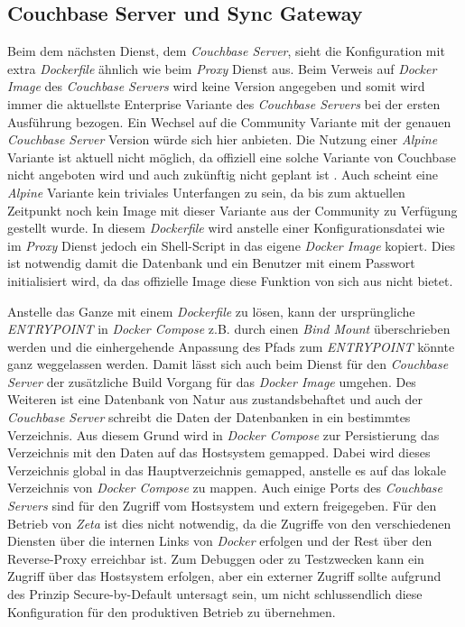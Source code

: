 \subsection{Couchbase Server und Sync Gateway}

Beim dem nächsten Dienst, dem \textit{Couchbase Server}, sieht die Konfiguration mit extra \textit{Dockerfile} ähnlich wie beim \textit{Proxy} Dienst aus. Beim Verweis auf \textit{Docker Image} des \textit{Couchbase Servers} wird keine Version angegeben und somit wird immer die aktuellste Enterprise Variante des \textit{Couchbase Servers} bei der ersten Ausführung bezogen. Ein Wechsel auf die Community Variante mit der genauen \textit{Couchbase Server} Version würde sich hier anbieten. Die Nutzung einer \textit{Alpine} Variante ist aktuell nicht möglich, da offiziell eine solche Variante von Couchbase nicht angeboten wird und auch zukünftig nicht geplant ist \cite{couchbase_alpine}. Auch scheint eine \textit{Alpine} Variante kein triviales Unterfangen zu sein, da bis zum aktuellen Zeitpunkt noch kein Image mit dieser Variante aus der Community zu Verfügung gestellt wurde. In diesem \textit{Dockerfile} wird anstelle einer Konfigurationsdatei wie im \textit{Proxy} Dienst jedoch ein Shell-Script in das eigene \textit{Docker Image} kopiert. Dies ist notwendig damit die Datenbank und ein Benutzer mit einem Passwort initialisiert wird, da das offizielle Image diese Funktion von sich aus nicht bietet.

Anstelle das Ganze mit einem \textit{Dockerfile} zu lösen, kann der ursprüngliche \textit{ENTRYPOINT} in \textit{Docker Compose} z.B. durch einen \textit{Bind Mount} überschrieben werden und die einhergehende Anpassung des Pfads zum \textit{ENTRYPOINT} könnte ganz weggelassen werden. Damit lässt sich auch beim Dienst für den \textit{Couchbase Server} der zusätzliche Build Vorgang für das \textit{Docker Image} umgehen. Des Weiteren ist eine Datenbank von Natur aus zustandsbehaftet und auch der \textit{Couchbase Server} schreibt die Daten der Datenbanken in ein bestimmtes Verzeichnis. Aus diesem Grund wird in \textit{Docker Compose} zur Persistierung das Verzeichnis mit den Daten auf das Hostsystem gemapped. Dabei wird dieses Verzeichnis global in das Hauptverzeichnis gemapped, anstelle es auf das lokale Verzeichnis von \textit{Docker Compose} zu mappen. Auch einige Ports des \textit{Couchbase Servers} sind für den Zugriff vom Hostsystem und extern freigegeben. Für den Betrieb von \textit{Zeta} ist dies nicht notwendig, da die Zugriffe von den verschiedenen Diensten über die internen Links von \textit{Docker} erfolgen und der Rest über den Reverse-Proxy erreichbar ist. Zum Debuggen oder zu Testzwecken kann ein Zugriff über das Hostsystem erfolgen, aber ein externer Zugriff sollte aufgrund des Prinzip Secure-by-Default untersagt sein, um nicht schlussendlich diese Konfiguration für den produktiven Betrieb zu übernehmen.

